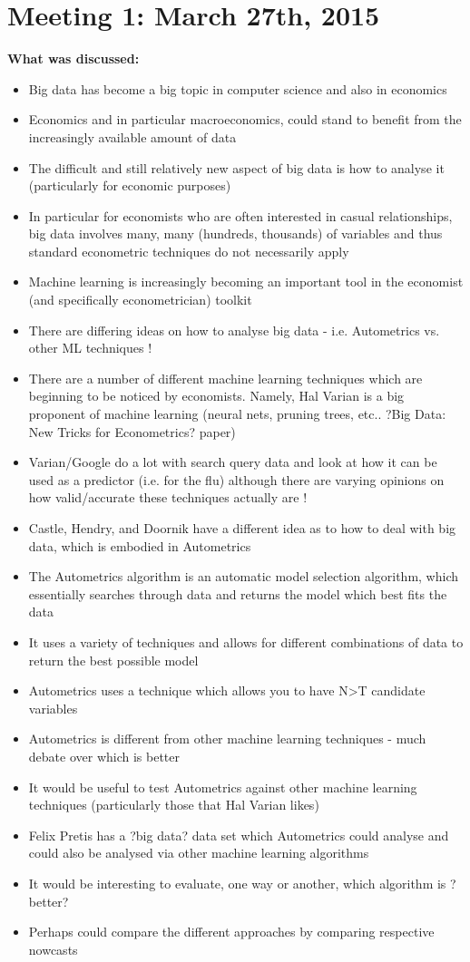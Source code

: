 \documentclass[11pt, oneside]{book}   	%
\begin{document}
\section{Meeting 1: March 27th, 2015}
\textbf{What was discussed:}
\begin{itemize}
\item Big data has become a big topic in computer science and also in economics
\item Economics and in particular macroeconomics, could stand to benefit from the increasingly available amount of data
\item The difficult and still relatively new aspect of big data is how to analyse it (particularly for economic purposes)
\item In particular for economists who are often interested in casual relationships, big data involves many, many (hundreds, thousands) of variables and thus standard
econometric techniques do not necessarily apply
\item Machine learning is increasingly becoming an important tool in the economist (and
specifically econometrician) toolkit 
\item There are differing ideas on how to analyse big data - i.e. Autometrics vs. other ML techniques !
\item There are a number of different machine learning techniques which are beginning to be noticed by economists. Namely, Hal Varian is a big proponent of machine learning (neural nets, pruning trees, etc.. ?Big Data: New Tricks for Econometrics? paper)
\item Varian/Google do a lot with search query data and look at how it can be used as a predictor (i.e. for the flu) although there are varying opinions on how valid/accurate these techniques actually are !
\item Castle, Hendry, and Doornik have a different idea as to how to deal with big data, which is embodied in Autometrics
\item The Autometrics algorithm is an automatic model selection algorithm, which essentially searches through data and returns the model which best fits the data
\item It uses a variety of techniques and allows for different combinations of data to return the best possible model
\item Autometrics uses a technique which allows you to have N>T candidate variables 
\item Autometrics is different from other machine learning techniques - much debate over which is better
\item It would be useful to test Autometrics against other machine learning techniques (particularly those that Hal Varian likes)
\item Felix Pretis has a ?big data? data set which Autometrics could analyse and could
also be analysed via other machine learning algorithms 
\item It would be interesting to evaluate, one way or another, which algorithm is ?better?
\item Perhaps could compare the different approaches by comparing respective nowcasts
\end{itemize}
\end{document}
